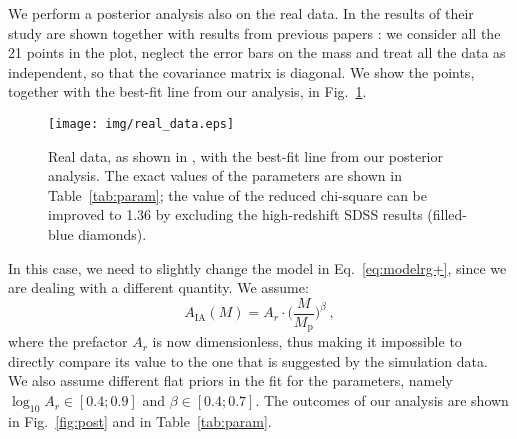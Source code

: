 \documentclass[a4paper,fleqn,usenatbib]{mnras}
\begin{document}
We perform a posterior analysis also on the real data. In \citet[figure 7]{vanUitertJoachimi2017} the results of their study are shown together with results from previous papers \citep{Joachimietal2011, Singhetal2015}: we consider all the 21 points in the plot, neglect the error bars on the mass
and treat all the data as independent, so that the covariance matrix is diagonal. We show the points, together with the best-fit line from our analysis, in Fig.~\ref{fig:realdata}.
\begin{figure}
	\centerline{	
	\texttt{[image: img/real\_data.eps]}}
	\caption{Real data, as shown in \citet[figure 7]{vanUitertJoachimi2017}, with the best-fit line from our posterior analysis. The exact values of the parameters are shown in Table~\ref{tab:param}; the value of the reduced chi-square can be improved to 1.36 by excluding the high-redshift SDSS results (filled-blue diamonds).}
	\label{fig:realdata}
\end{figure}

In this case, we need to slightly change the model in Eq.~\ref{eq:modelrg+}, since we are dealing with a different quantity. We assume:
\begin{equation}
    A_{\mathrm{IA}} (M) = A_r \cdot  \biggl ( \frac{M}{M_{\mathrm{p}}} \biggl )^{\beta} \ ,
	\label{eq:modelrg+data}
\end{equation}
where the prefactor $A_r$ is now dimensionless, thus making it impossible to directly compare its value to the one that is suggested by the simulation data. We also assume different flat priors in the fit for the parameters, namely $\log_{10} A_r \in [0.4;0.9]$ and $\beta \in [0.4;0.7]$. The outcomes of our analysis are shown in Fig.~\ref{fig:post}\protect{} and in Table~\ref{tab:param}.
\end{document}
